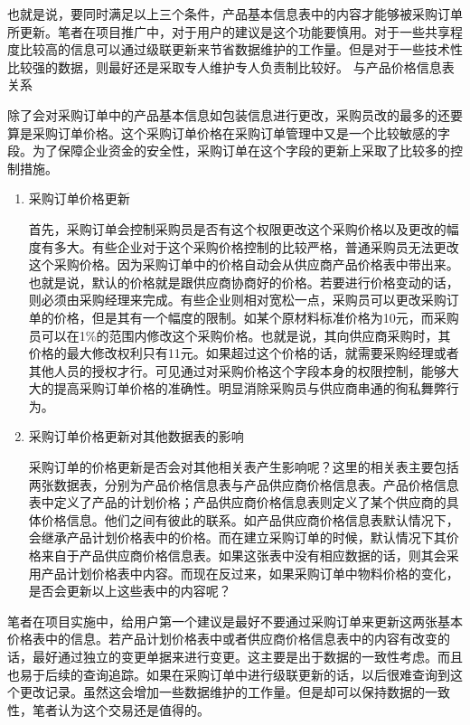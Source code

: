     也就是说，要同时满足以上三个条件，产品基本信息表中的内容才能够被采购订单所更新。笔者在项目推广中，对于用户的建议是这个功能要慎用。对于一些共享程度比较高的信息可以通过级联更新来节省数据维护的工作量。但是对于一些技术性比较强的数据，则最好还是采取专人维护专人负责制比较好。
与产品价格信息表关系

    除了会对采购订单中的产品基本信息如包装信息进行更改，采购员改的最多的还要算是采购订单价格。这个采购订单价格在采购订单管理中又是一个比较敏感的字段。为了保障企业资金的安全性，采购订单在这个字段的更新上采取了比较多的控制措施。
    \begin{enumerate}

        \item  采购订单价格更新

        首先，采购订单会控制采购员是否有这个权限更改这个采购价格以及更改的幅度有多大。有些企业对于这个采购价格控制的比较严格，普通采购员无法更改这个采购价格。因为采购订单中的价格自动会从供应商产品价格表中带出来。也就是说，默认的价格就是跟供应商协商好的价格。若要进行价格变动的话，则必须由采购经理来完成。有些企业则相对宽松一点，采购员可以更改采购订单的价格，但是其有一个幅度的限制。如某个原材料标准价格为10元，而采购员可以在1\%的范围内修改这个采购价格。也就是说，其向供应商采购时，其价格的最大修改权利只有11元。如果超过这个价格的话，就需要采购经理或者其他人员的授权才行。可见通过对采购价格这个字段本身的权限控制，能够大大的提高采购订单价格的准确性。明显消除采购员与供应商串通的徇私舞弊行为。

        \item  采购订单价格更新对其他数据表的影响

        采购订单的价格更新是否会对其他相关表产生影响呢？这里的相关表主要包括两张数据表，分别为产品价格信息表与产品供应商价格信息表。产品价格信息表中定义了产品的计划价格；产品供应商价格信息表则定义了某个供应商的具体价格信息。他们之间有彼此的联系。如产品供应商价格信息表默认情况下，会继承产品计划价格表中的价格。而在建立采购订单的时候，默认情况下其价格来自于产品供应商价格信息表。如果这张表中没有相应数据的话，则其会采用产品计划价格表中内容。而现在反过来，如果采购订单中物料价格的变化，是否会更新以上这些表中的内容呢？
    \end{enumerate}

    笔者在项目实施中，给用户第一个建议是最好不要通过采购订单来更新这两张基本价格表中的信息。若产品计划价格表中或者供应商价格信息表中的内容有改变的话，最好通过独立的变更单据来进行变更。这主要是出于数据的一致性考虑。而且也易于后续的查询追踪。如果在采购订单中进行级联更新的话，以后很难查询到这个更改记录。虽然这会增加一些数据维护的工作量。但是却可以保持数据的一致性，笔者认为这个交易还是值得的。

